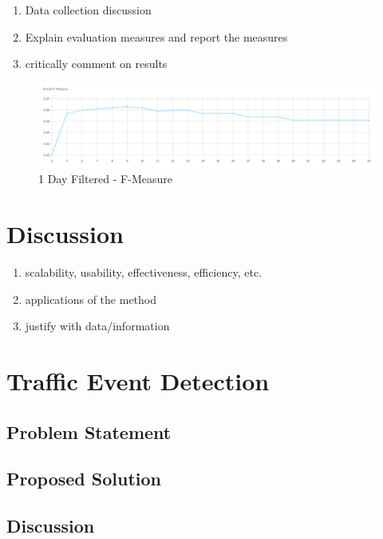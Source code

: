 \documentclass[a4paper,portrait,12pt]{article}
\begin{document}
\begin{enumerate}
	\item Data collection discussion
	\item Explain evaluation measures and report the measures
	\item critically comment on results
\end{enumerate}

\begin{figure}[h!]
	\centering
	\includegraphics[width=\linewidth]{images/1day-filtered-f-measure.png}
	\caption{1 Day Filtered - F-Measure}
	\label{fig:1day-filtered-f-measure}
\end{figure}

\section{Discussion}
\label{section-discussion}
\begin{enumerate}
	\item scalability, usability, effectiveness, efficiency, etc.
	\item applications of the method
	\item justify with data/information
\end{enumerate}

\section{Traffic Event Detection}
\subsection{Problem Statement}
\subsection{Proposed Solution}
\subsection{Discussion}

\newpage
\nocite{*}


\end{document}

